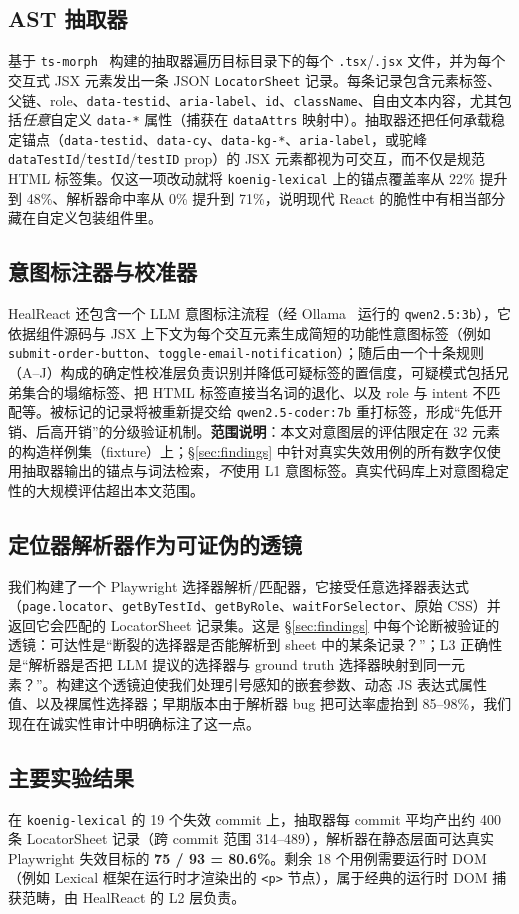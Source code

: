 \subsection{AST 抽取器}
基于 \texttt{ts-morph}~\cite{tsmorph} 构建的抽取器遍历目标目录下的每个 \texttt{.tsx}/\texttt{.jsx} 文件，并为每个交互式 JSX 元素发出一条 JSON \texttt{LocatorSheet} 记录。每条记录包含元素标签、父链、role、\texttt{data-testid}、\texttt{aria-label}、\texttt{id}、\texttt{className}、自由文本内容，尤其包括\emph{任意}自定义 \texttt{data-*} 属性（捕获在 \texttt{dataAttrs} 映射中）。抽取器还把任何承载稳定锚点（\texttt{data-testid}、\texttt{data-cy}、\texttt{data-kg-*}、\texttt{aria-label}，或驼峰 \texttt{dataTestId}/\texttt{testId}/\texttt{testID} prop）的 JSX 元素都视为可交互，而不仅是规范 HTML 标签集。仅这一项改动就将 \texttt{koenig-lexical} 上的锚点覆盖率从 22\% 提升到 48\%、解析器命中率从 0\% 提升到 71\%，说明现代 React 的脆性中有相当部分藏在自定义包装组件里。

\subsection{意图标注器与校准器}
HealReact 还包含一个 LLM 意图标注流程（经 Ollama~\cite{ollama} 运行的 \texttt{qwen2.5:3b}），它依据组件源码与 JSX 上下文为每个交互元素生成简短的功能性意图标签（例如 \texttt{submit-order-button}、\texttt{toggle-email-notification}）；随后由一个十条规则（A--J）构成的确定性校准层负责识别并降低可疑标签的置信度，可疑模式包括兄弟集合的塌缩标签、把 HTML 标签直接当名词的退化、以及 role 与 intent 不匹配等。被标记的记录将被重新提交给 \texttt{qwen2.5-coder:7b} 重打标签，形成“先低开销、后高开销”的分级验证机制。\textbf{范围说明}：本文对意图层的评估限定在 32 元素的构造样例集（fixture）上；\S\ref{sec:findings} 中针对真实失效用例的所有数字仅使用抽取器输出的锚点与词法检索，\emph{不}使用 L1 意图标签。真实代码库上对意图稳定性的大规模评估超出本文范围。

\subsection{定位器解析器作为可证伪的透镜}
我们构建了一个 Playwright 选择器解析/匹配器，它接受任意选择器表达式（\texttt{page.locator}、\texttt{getByTestId}、\texttt{getByRole}、\texttt{waitForSelector}、原始 CSS）并返回它会匹配的 LocatorSheet 记录集。这是 \S\ref{sec:findings} 中每个论断被验证的透镜：可达性是“断裂的选择器是否能解析到 sheet 中的某条记录？”；L3 正确性是“解析器是否把 LLM 提议的选择器与 ground truth 选择器映射到同一元素？”。构建这个透镜迫使我们处理引号感知的嵌套参数、动态 JS 表达式属性值、以及裸属性选择器；早期版本由于解析器 bug 把可达率虚抬到 85--98\%，我们现在在诚实性审计中明确标注了这一点。

\subsection{主要实验结果}
在 \texttt{koenig-lexical} 的 19 个失效 commit 上，抽取器每 commit 平均产出约 400 条 LocatorSheet 记录（跨 commit 范围 314--489），解析器在静态层面可达真实 Playwright 失效目标的 \textbf{75 / 93 = 80.6\%}。剩余 18 个用例需要运行时 DOM（例如 Lexical 框架在运行时才渲染出的 \texttt{<p>} 节点），属于经典的运行时 DOM 捕获范畴，由 HealReact 的 L2 层负责。
